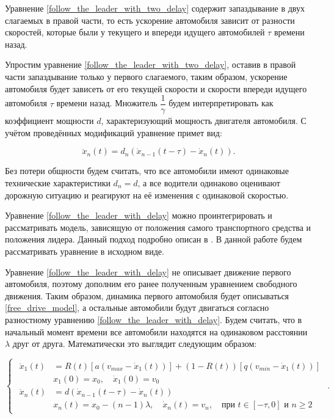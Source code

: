 \documentclass[12pt, a4paper]{extarticle}
\numberwithin{equation}{section}
\numberwithin{figure}{section}
\begin{document}
Уравнение \eqref{follow_the_leader_with_two_delay} содержит запаздывание в двух слагаемых в правой части, то есть ускорение автомобиля зависит от разности скоростей, которые были у текущего и впереди идущего автомобилей $\tau$ времени назад.

Упростим уравнение \eqref{follow_the_leader_with_two_delay}, оставив в правой части запаздывание только у первого слагаемого, таким образом, ускорение автомобиля будет зависеть от его текущей скорости и скорости впереди идущего автомобиля $\tau$ времени назад. Множитель $\dfrac{1}{\gamma}$ будем интерпретировать как коэффициент мощности $d$, характеризующий мощность двигателя автомобиля. С учётом проведённых модификаций уравнение примет вид:

\begin{equation} \label{follow_the_leader_with_delay}
\ddot{x}_n(t) = d_{n} (\dot{x}_{n-1}(t-\tau) - \dot{x}_{n}(t)).
\end{equation}

Без потери общности будем считать, что все автомобили имеют одинаковые технические характеристики $d_n = d$, а все водители одинаково оценивают дорожную ситуацию и реагируют на её изменения с одинаковой скоростью.

Уравнение \eqref{follow_the_leader_with_delay} можно проинтегрировать и рассматривать модель, зависящую от положения самого транспортного средства и положения лидера. Данный подход подробно описан в \cite{Course}. В данной работе будем рассматривать уравнение в исходном виде. 

Уравнение \eqref{follow_the_leader_with_delay} не описывает движение первого автомобиля, поэтому дополним его ранее полученным уравнением свободного движения. Таким образом, динамика первого автомобиля будет описываться \eqref{free_drive_model}, а остальные автомобили будут двигаться согласно разностному уравнению \eqref{follow_the_leader_with_delay}. Будем считать, что в начальный момент времени все автомобили находятся на одинаковом расстоянии $\lambda$ друг от друга. Математически это выглядит следующим образом:

\begin{equation} \label{follow_the_leader_full_model}
\begin{cases}
\begin{split}
\ddot{x}_1(t)& = R(t) \left[ a\left(v_{max}-\dot{x}_1(t) \right)\right] + (1-R(t)) \left[ q\left( v_{min} - \dot{x}_1(t)\right) \right] \\
&x_{1}(0)=x_0, \quad \dot{x}_{1}(0)=v_{0}\\
\ddot{x}_{n}(t)& = d(\dot{x}_{n-1}(t-\tau)-\dot{x}_{n}(t)) \\
&x_n(t)=x_0-(n-1)\lambda, \quad \dot{x}_n(t)=v_{n}, \quad \text{при } t \in [-\tau,0] \text{ и } n\geq2
\end{split}
\end{cases}.
\end{equation}
\end{document}
